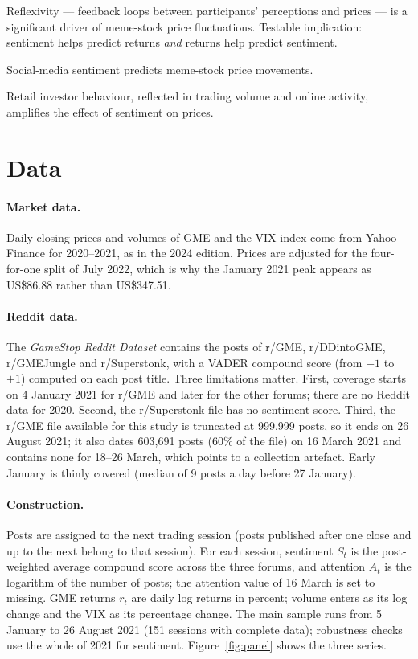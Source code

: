 \documentclass[11pt,a4paper]{article}
\begin{document}
\begin{description}[leftmargin=1.2cm,style=nextline]
\item[H1] Reflexivity --- feedback loops between participants' perceptions and
prices --- is a significant driver of meme-stock price fluctuations. Testable
implication: sentiment helps predict returns \emph{and} returns help predict
sentiment.
\item[H2] Social-media sentiment predicts meme-stock price movements.
\item[H3] Retail investor behaviour, reflected in trading volume and online
activity, amplifies the effect of sentiment on prices.
\end{description}

\section{Data}\label{sec:data}

\paragraph{Market data.} Daily closing prices and volumes of GME and the VIX
index come from Yahoo Finance for 2020--2021, as in the 2024 edition. Prices are
adjusted for the four-for-one split of July 2022, which is why the January 2021
peak appears as US\$86.88 rather than US\$347.51.

\paragraph{Reddit data.} The \emph{GameStop Reddit Dataset} \citep{han2023}
contains the posts of r/GME, r/DDintoGME, r/GMEJungle and r/Superstonk, with a
VADER compound score (from $-1$ to $+1$) computed on each post title. Three
limitations matter. First, coverage starts on 4 January 2021 for r/GME and later
for the other forums; there are no Reddit data for 2020. Second, the r/Superstonk
file has no sentiment score. Third, the r/GME file available for this study is
truncated at 999{,}999 posts, so it ends on 26 August 2021; it also dates 603{,}691
posts (60\% of the file) on 16 March 2021 and contains none for 18--26 March,
which points to a collection artefact. Early January is thinly covered (median of
9 posts a day before 27 January).

\paragraph{Construction.} Posts are assigned to the next trading session (posts
published after one close and up to the next belong to that session). For each
session, sentiment $S_t$ is the post-weighted average compound score across the
three forums, and attention $A_t$ is the logarithm of the number of posts; the
attention value of 16 March is set to missing. GME returns $r_t$ are daily log
returns in percent; volume enters as its log change and the VIX as its percentage
change. The main sample runs from 5 January to 26 August 2021 (151 sessions with
complete data); robustness checks use the whole of 2021 for sentiment.
Figure~\ref{fig:panel} shows the three series.
\end{document}
